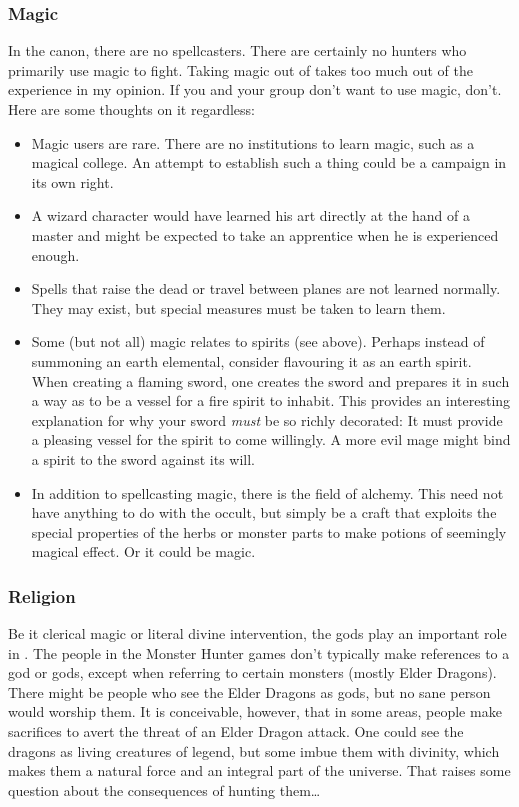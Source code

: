 \subsubsection{Magic}
In the \MH{} canon, there are no spellcasters. There are certainly no hunters who primarily use magic to fight. Taking magic out of \DND{} takes too much out of the experience in my opinion. If you and your group don't want to use magic, don't. Here are some thoughts on it regardless:
\begin{itemize}
\item Magic users are rare. There are no institutions to learn magic, such as a magical college. An attempt to establish such a thing could be a campaign in its own right.
\item A wizard character would have learned his art directly at the hand of a master and might be expected to take an apprentice when he is experienced enough.
\item Spells that raise the dead or travel between planes are not learned normally. They may exist, but special measures must be taken to learn them.
\item Some (but not all) magic relates to spirits (see above). Perhaps instead of summoning an earth elemental, consider flavouring it as an earth spirit. When creating a flaming sword, one creates the sword and prepares it in such a way as to be a vessel for a fire spirit to inhabit. This provides an interesting explanation for why your sword \textit{must} be so richly decorated: It must provide a pleasing vessel for the spirit to come willingly. A more evil mage might bind a spirit to the sword against its will.
\item In addition to spellcasting magic, there is the field of alchemy. This need not have anything to do with the occult, but simply be a craft that exploits the special properties of the herbs or monster parts to make potions of seemingly magical effect. Or it could be magic.
\end{itemize}

\subsubsection{Religion}


Be it clerical magic or literal divine intervention, the gods play an important role in \DND. The people in the Monster Hunter games don't typically make references to a god or gods, except when referring to certain monsters (mostly Elder Dragons). There might be people who see the Elder Dragons as gods, but no sane person would worship them. It is conceivable, however, that in some areas, people make sacrifices to avert the threat of an Elder Dragon attack. One could see the dragons as living creatures of legend, but some imbue them with divinity, which makes them a natural force and an integral part of the universe. That raises some question about the consequences of hunting them\ldots

